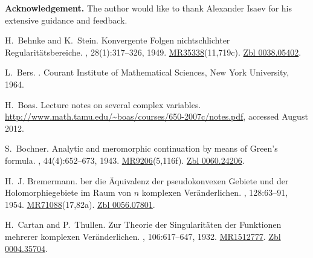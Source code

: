 \documentclass[11pt,a4paper, final, twoside]{article}
\numberwithin{equation}{section}
\begin{document}
\noindent \textbf{Acknowledgement.} The author would like to thank Alexander Isaev for his extensive guidance and feedback.

%
%
%

\begin{thebibliography}{10}

H.~Behnke and K.~Stein.
\newblock Konvergente {F}olgen nichtschlichter {R}egularit\"atsbereiche.
, 28(1):317--326, 1949.
\newblock
  \href{http://www.ams.org/mathscinet-getitem?mr=35338}{MR35338}(11,719c).
  \href{http://zbmath.org/?q=an:0038.05402}{Zbl 0038.05402}.

L.~Bers.
.
\newblock Courant Institute of Mathematical Sciences, New York University,
  1964.

H.~Boas.
\newblock Lecture notes on several complex variables.
\newblock \url{http://www.math.tamu.edu/~boas/courses/650-2007c/notes.pdf},
  accessed August 2012.

S.~Bochner.
\newblock Analytic and meromorphic continuation by means of {G}reen's formula.
, 44(4):652--673, 1943.
\newblock \href{http://www.ams.org/mathscinet-getitem?mr=9206}{MR9206}(5,116f).
  \href{http://zbmath.org/?q=an:0060.24206}{Zbl 0060.24206}.

H.~J. Bremermann.
ber die \"{A}quivalenz der pseudokonvexen {G}ebiete und der
  {H}olomorphiegebiete im {R}aum von $n$ komplexen {V}er\"anderlichen.
, 128:63--91, 1954.
\newblock
  \href{http://www.ams.org/mathscinet-getitem?mr=71088}{MR71088}(17,82a).
  \href{http://zbmath.org/?q=an:0056.07801}{Zbl 0056.07801}.

H.~Cartan and P.~Thullen.
\newblock Zur {T}heorie der {S}ingularit\"aten der {F}unktionen mehrerer
  komplexen {V}er\"anderlichen.
, 106:617--647, 1932.
\newblock \href{http://www.ams.org/mathscinet-getitem?mr=1512777}{MR1512777}.
  \href{http://zbmath.org/?q=an:0004.35704}{Zbl 0004.35704}.


\end{thebibliography}
\end{document}
